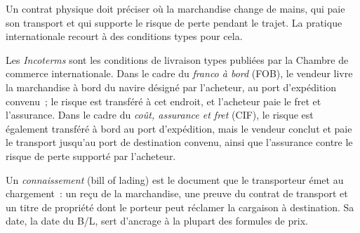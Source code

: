 Un contrat physique doit préciser où la marchandise change de mains, qui paie son transport
et qui supporte le risque de perte pendant le trajet. La pratique internationale
recourt à des conditions types pour cela.

\begin{definition}\label{def:m3:physical-commodity-markets:incoterms}
Les \emph{Incoterms} sont les conditions de livraison types publiées par la
Chambre de commerce internationale. Dans le cadre du \emph{franco à bord}
(FOB), le vendeur livre la marchandise à bord du navire désigné par l'acheteur,
au port d'expédition convenu~; le risque est transféré à cet endroit, et l'acheteur paie le fret
et l'assurance. Dans le cadre du \emph{coût, assurance et fret}
(CIF), le risque est également transféré à bord au port d'expédition, mais le vendeur
conclut et paie le transport jusqu'au port de destination convenu, ainsi que l'assurance
contre le risque de perte supporté par l'acheteur.
\end{definition}

\begin{definition}[Connaissement]\label{def:m3:physical-commodity-markets:bl}
Un \emph{connaissement} (bill of lading) est le document que le transporteur émet
au chargement~: un reçu de la marchandise, une preuve du contrat de transport et un titre
de propriété dont le porteur peut réclamer la cargaison à destination. Sa date, la date du
B/L, sert d'ancrage à la plupart des formules de prix.
\end{definition}

